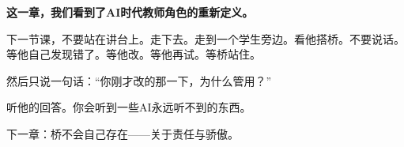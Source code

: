 \vspace{1cm}

\begin{decision-point}
\label{decision:chap11}

\noindent\textbf{这一章，我们看到了AI时代教师角色的重新定义。}

\vspace{0.3cm}

\noindent 下一节课，不要站在讲台上。走下去。走到一个学生旁边。看他搭桥。不要说话。等他自己发现错了。等他改。等他再试。等桥站住。

\noindent 然后只说一句话：``你刚才改的那一下，为什么管用？''

\noindent 听他的回答。你会听到一些AI永远听不到的东西。
\end{decision-point}

\vspace{0.5cm}

\begin{flushright}
{\small\color{muted} 下一章：桥不会自己存在——关于责任与骄傲。}
\end{flushright}